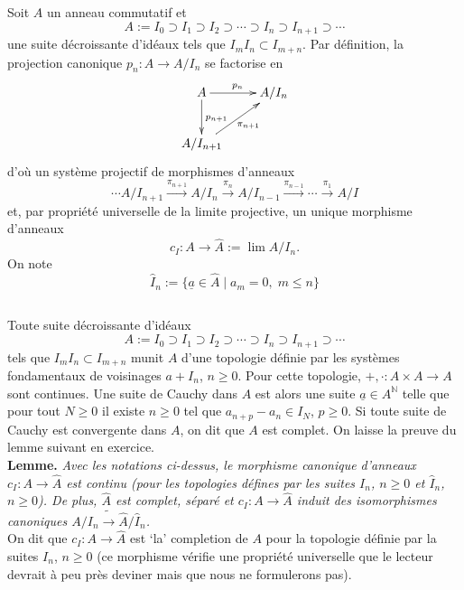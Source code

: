 \documentclass[a4paper, oneside, 12pt]{book}
\theoremstyle{theoremeStyle} %
\theoremstyle{definition} %
\newcommand{\N}{\mathbb{N}}
\begin{document}
 \section{}Soit $A$ un anneau commutatif et  $$A:=I_0\supset  I_1\supset I_2\supset \cdots \supset I_n\supset I_{n+1}\supset \cdots$$
une suite décroissante d'idéaux  tels que $I_m I_n\subset I_{m+n}$.
Par définition, la projection canonique $p_n:A\rightarrow A/I_n$ se factorise en
$$\xymatrix{A\ar[r]^{p_n}\ar[d]^{p_{n+1}}&A/I_n\\
A/I_{n+1}\ar[ur]_{\pi_{n+1}}&}$$
d'où un système projectif de morphismes d'anneaux
$$\cdots  A/I_{n+1}\stackrel{\pi_{n+1}}{\rightarrow} A/I_n\stackrel{\pi_{n }}{\rightarrow}A/I_{n-1}\stackrel{\pi_{n-1}}{\rightarrow}\cdots \stackrel{\pi_1}{\rightarrow}A/I$$
et, par propriété universelle de la limite projective, un unique morphisme d'anneaux $$c_I:A\rightarrow \widehat{A}:=\lim A/I_n.$$
 On note $$\widehat{I}_n:=\lbrace \underline{a}\in \widehat{A}\; |\; a_m=0,\; m\leq n\rbrace $$
 \subsection{}Toute suite décroissante d'idéaux
  $$A:=I_0\supset  I_1\supset I_2\supset \cdots \supset I_n\supset I_{n+1}\supset \cdots$$
  tels que $I_m I_n\subset I_{m+n}$
 munit $A$ d'une   topologie définie par les systèmes fondamentaux de voisinages $a+I_n$, $n\geq 0$. Pour cette topologie, $+,\cdot: A\times A\rightarrow A$ sont continues. Une suite de Cauchy dans $A$ est alors une suite $\underline{a}\in A^\N$ telle que pour tout $N\geq 0$ il  existe $n\geq 0$ tel que $a_{n+p}-a_n\in I_N$, $p\geq 0$. Si toute suite de Cauchy est convergente dans $A$, on dit que $A$ est complet. On laisse la preuve du lemme suivant en exercice.\\


 \textbf{Lemme.} \textit{Avec les notations ci-dessus,  le morphisme canonique d'anneaux $c_I:A\rightarrow \widehat{A}$ est continu (pour les topologies défines par les suites $I_n$, $n\geq 0$ et $\widehat{I}_n$, $n\geq 0$). De plus, $\widehat{A}$ est complet, séparé et $c_I:A\rightarrow \widehat{A}$ induit des isomorphismes canoniques $A/I_n\tilde{\rightarrow} \widehat{A}/\widehat{I}_n$.}\\

    On dit que   $c_I:A\rightarrow \widehat{A}$ est `la' completion de $A$ pour la topologie définie par la suites  $I_n$, $n\geq 0$ (ce morphisme vérifie une propriété universelle que le lecteur devrait à peu près deviner mais que nous ne formulerons pas).\\
\end{document}
